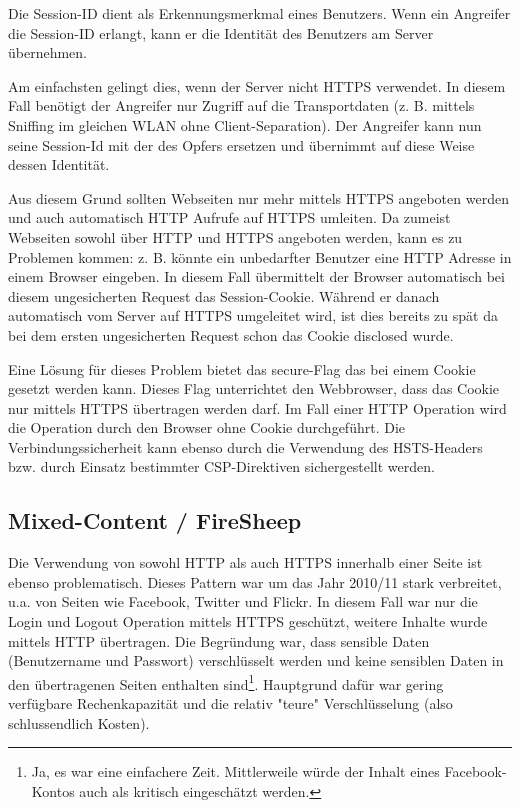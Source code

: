 Die Session-ID dient als Erkennungsmerkmal eines Benutzers. Wenn ein Angreifer die Session-ID erlangt, kann er die Identität des Benutzers am Server übernehmen.

Am einfachsten gelingt dies, wenn der Server nicht HTTPS verwendet. In diesem Fall benötigt der Angreifer nur Zugriff auf die Transportdaten (z. B. mittels Sniffing im gleichen WLAN ohne Client-Separation). Der Angreifer kann nun seine Session-Id mit der des Opfers ersetzen und übernimmt auf diese Weise dessen Identität.

Aus diesem Grund sollten Webseiten nur mehr mittels HTTPS angeboten werden und auch automatisch HTTP Aufrufe auf HTTPS umleiten. Da zumeist Webseiten sowohl über HTTP und HTTPS angeboten werden, kann es zu Problemen kommen: z. B. könnte ein unbedarfter Benutzer eine HTTP Adresse in einem Browser eingeben. In diesem Fall übermittelt der Browser automatisch bei diesem ungesicherten Request das Session-Cookie. Während er danach automatisch vom Server auf HTTPS umgeleitet wird, ist dies bereits zu spät da bei dem ersten ungesicherten Request schon das Cookie disclosed wurde.

Eine Lösung für dieses Problem bietet das secure-Flag das bei einem Cookie gesetzt werden kann. Dieses Flag unterrichtet den Webbrowser, dass das Cookie nur mittels HTTPS übertragen werden darf. Im Fall einer HTTP Operation wird die Operation durch den Browser ohne Cookie durchgeführt.  Die Verbindungssicherheit kann ebenso durch die Verwendung des HSTS-Headers bzw. durch Einsatz bestimmter CSP-Direktiven sichergestellt werden.

\subsection{Mixed-Content / FireSheep}

Die Verwendung von sowohl HTTP als auch HTTPS innerhalb einer Seite ist ebenso problematisch. Dieses Pattern war um das Jahr 2010/11 stark verbreitet, u.a. von Seiten wie Facebook, Twitter und Flickr. In diesem Fall war nur die Login und Logout Operation mittels HTTPS geschützt, weitere Inhalte wurde mittels HTTP übertragen. Die Begründung war, dass sensible Daten (Benutzername und Passwort) verschlüsselt werden und keine sensiblen Daten in den übertragenen Seiten enthalten sind\footnote{Ja, es war eine einfachere Zeit. Mittlerweile würde der Inhalt eines Facebook-Kontos auch als kritisch eingeschätzt werden.}. Hauptgrund dafür war gering verfügbare Rechenkapazität und die relativ "teure" Verschlüsselung (also schlussendlich Kosten).

